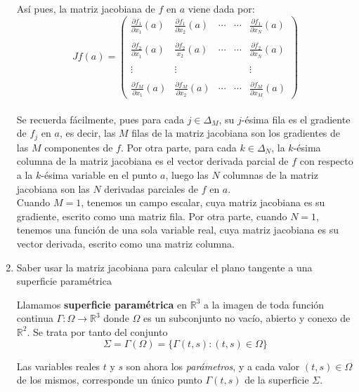 \documentclass[a4paper, 12pt]{article}
\begin{document}
\begin{enumerate}[label=\textbf{\arabic*}.]
Así pues, la matriz jacobiana de \(f\) en \(a\) viene dada por:
\[
Jf(a) =
\begin{pmatrix}
\frac{\partial f_1}{\partial x_1} (a) & \frac{\partial f_1}{\partial x_2} (a) & \dotsb & \dotsb & \frac{\partial f_1}{\partial x_N} (a) \\
\\
\frac{\partial f_2}{\partial x_1} (a) & \frac{\partial f_2 }{x_2 } (a) & \dotsb & \dotsb & \frac{\partial f_2}{\partial x_N} (a) \\
\\
\vdots & \vdots & &  & \vdots \\
\\
\frac{\partial f_M}{\partial x_1} (a) & \frac{\partial f_M}{\partial x_2} (a) & \dotsb & \dotsb & \frac{\partial f_M}{\partial x_M} (a)
\end{pmatrix}
\] \\

Se recuerda fácilmente, pues para cada \(j \in \Delta_M\), su \(j\)-ésima fila es el gradiente de \(f_j\) en \(a\), es decir, las \(M\) filas de la matriz jacobiana son los gradientes de las \(M\) componentes de \(f\). Por otra parte, para cada \(k \in \Delta_N\), la \(k\)-ésima columna de la matriz jacobiana es el vector derivada parcial de \(f\) con respecto a la \(k\)-ésima variable en el punto \(a\), luego las \(N\) columnas de la matriz jacobiana son las \(N\) derivadas parciales de \(f\) en \(a\). \\

Cuando \(M = 1\), tenemos un campo escalar, cuya matriz jacobiana es su gradiente, escrito como una matriz fila. Por otra parte, cuando \(N = 1\), tenemos una función de una sola variable real, cuya matriz jacobiana es su vector derivada, escrito como una matriz columna.

\bigskip

\item Saber usar la matriz jacobiana para calcular el plano tangente a una superficie paramétrica

Llamamos \textbf{superficie paramétrica} en \(\mathbb{R}^3\) a la imagen de toda función continua \(\Gamma: \Omega \to \mathbb{R}^3\) donde \(\Omega\) es un subconjunto no vacío, abierto y conexo de \(\mathbb{R}^2\). Se trata por tanto del conjunto
\[
	\Sigma = \Gamma (\Omega) = \{ \Gamma (t,s): (t,s) \in \Omega\}
\]

Las variables reales \(t\) y \(s\) son ahora los \textit{parámetros}, y a cada valor \((t,s) \in \Omega\) de los mismos, corresponde un único punto \(\Gamma (t,s)\) de la superficie \(\Sigma\). \\


\end{enumerate}
\end{document}
